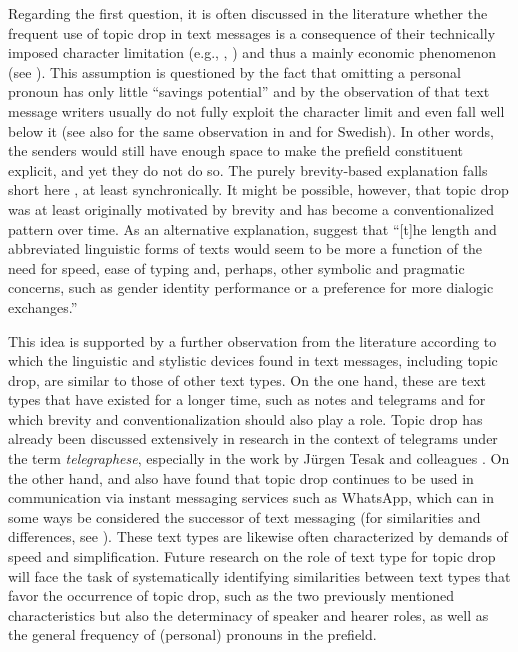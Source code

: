 Regarding the first question, it is often discussed in the literature whether the frequent use of topic drop in text messages is a consequence of their technically imposed character limitation (e.g., \cite[100]{doring2002}, \cite[7--8]{durscheid.brommer2009}) and thus a mainly economic phenomenon (see ).
This assumption is questioned by the fact that omitting a personal pronoun has only little ``savings potential'' \citep[108]{doring2002} and by the observation of \citet[103--104]{doring2002} that text message writers usually do not fully exploit the character limit and even fall well below it (see also \cite[172]{thurlow.poff2013} for the same observation in  and \cite[331]{hardafsegerstad2005} for Swedish). 
In other words, the senders would still have enough space to make the prefield constituent explicit, and yet they do not do so.
The purely brevity-based explanation falls short here \citep[see also][45]{dittmann.etal2007}, at least synchronically.
It might be possible, however, that topic drop was at least originally motivated by brevity and has become a conventionalized pattern over time.
As an alternative explanation, \citet[172]{thurlow.poff2013} suggest that ``[t]he length and abbreviated linguistic forms of texts would seem to be more a function of the need for speed, ease of typing and, perhaps, other symbolic and pragmatic concerns, such as gender identity performance or a preference for more dialogic exchanges.''

This idea is supported by a further observation from the literature according to which the linguistic and stylistic devices found in text messages, including topic drop, are similar to those of other text types.
On the one hand, these are text types that have existed for a longer time, such as notes \citep[173]{thurlow.poff2013} and telegrams \citep{reis1982, barton1998, dittmann.etal2007} and for which brevity and conventionalization should also play a role.
Topic drop has already been discussed extensively in research in the context of telegrams under the term \textit{telegraphese}, especially in the work by Jürgen Tesak and colleagues \citep[e.g.,][]{tesak.dittmann1991,tesak.etal1995, tesak.niemi1997}.
On the other hand, \citet[230--237]{frick2017} and also \citet{stark.meier2017} have found that topic drop continues to be used in communication via instant messaging services such as WhatsApp, which can in some ways be considered the successor of text messaging (for similarities and differences, see \cite{durscheid.frick2014}).
These text types are likewise often characterized by demands of speed and simplification.
Future research on the role of text type for topic drop will face the task of systematically identifying similarities between text types that favor the occurrence of topic drop, such as the two previously mentioned characteristics but also the determinacy of speaker and hearer roles, as well as the general frequency of (personal) pronouns in the prefield.

